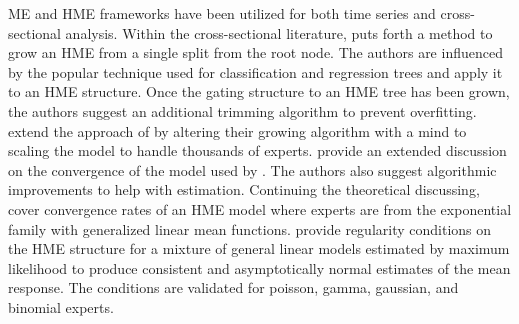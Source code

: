 \documentclass[12pt]{article}
\theoremstyle{definition}
\begin{document}
ME and HME frameworks have been utilized for both time series and cross-sectional analysis. Within the cross-sectional literature, \citet{WaterhouseRobinson1995} puts forth a method to grow an HME from a single split from the root node. The authors are influenced by the popular technique used for classification and regression trees \citep{CART1984} and apply it to an HME structure. Once the gating structure to an HME tree has been grown, the authors suggest an additional trimming algorithm to prevent overfitting. \citet{FFW1997} extend the approach of \citet{WaterhouseRobinson1995} by altering their growing algorithm with a mind to scaling the model to handle thousands of experts. \citet{JordanXuConverge1995} provide an extended discussion on the convergence of the model used by \citet{JordanJacobs1993}. The authors also suggest algorithmic improvements to help with estimation. Continuing the theoretical discussing, \citet{JiangTanner1999} cover convergence rates of an HME model where experts are from the exponential family with generalized linear mean functions. \citet{JiangTanner2000} provide regularity conditions on the HME structure for a mixture of general linear models estimated by maximum likelihood to produce consistent and asymptotically normal estimates of the mean response. The conditions are validated for poisson, gamma, gaussian, and binomial experts.

\bigskip
\end{document}
